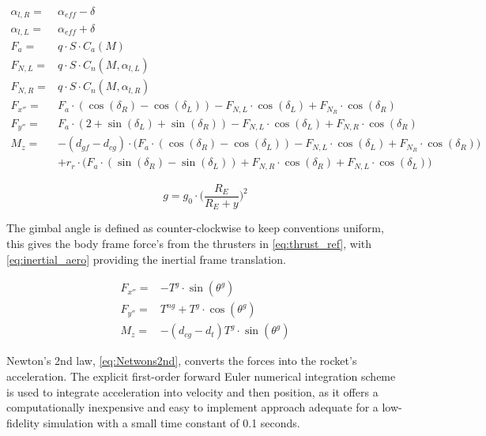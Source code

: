 \begin{equation}
\begin{aligned}
    \alpha_{l,R} =& \alpha_{eff} - \delta \\
    \alpha_{l,L} =& \alpha_{eff} + \delta \\
    F_a =& q \cdot S \cdot C_a(M) \\
    F_{N,L} =& q \cdot S \cdot C_n(M,\alpha_{l,L}) \\
    F_{N,R} =& q \cdot S \cdot C_n(M,\alpha_{l,R}) \\
    F_{x''} =& F_a \cdot (\cos(\delta_R) - \cos(\delta_L)) -F_{N,L} \cdot \cos(\delta_L) + F_{N_R} \cdot \cos(\delta_R) \\
    F_{y''} =& F_a \cdot (2 + \sin(\delta_L) + \sin(\delta_R)) - F_{N,L} \cdot \cos(\delta_L) + F_{N,R} \cdot \cos(\delta_R) \\
    M_z =& -(d_{gf}-d_{cg}) \cdot \bigg(F_a \cdot (\cos(\delta_R) - \cos(\delta_L)) -F_{N,L} \cdot \cos(\delta_L) + F_{N_R} \cdot \cos(\delta_R)\bigg) \\&+ r_r \cdot \bigg(F_{a} \cdot(\sin(\delta_R)-\sin(\delta_L) )+ F_{N,R} \cdot \cos(\delta_R) + F_{N,L} \cdot \cos(\delta_L)\bigg)
\end{aligned}
\label{eq:grid_fin_local_alpha}
\end{equation}


\begin{equation}
    g = g_0 \cdot \bigg(\frac{R_{E}}{R_{E} + y}\bigg)^2
\label{eq:grav}
\end{equation}


The gimbal angle is defined as counter-clockwise to keep conventions uniform, this gives the body frame force's from the thrusters in \autoref{eq:thrust_ref}, with \autoref{eq:inertial_aero} providing the inertial frame translation.

\begin{equation}
\begin{aligned}
    F_{x''} =& - T^g \cdot \sin(\theta^g) \\
    F_{y''} =& T^{ng} + T^g \cdot \cos(\theta^g) \\
    M_z =& -(d_{cg} - d_{t}) T^g \cdot \sin(\theta^g)
\end{aligned}
\label{eq:thrust_ref}
\end{equation}

Newton's 2nd law, \autoref{eq:Netwons2nd}, converts the forces into the rocket's acceleration. The explicit first-order forward Euler numerical integration scheme is used to integrate acceleration into velocity and then position, as it offers a computationally inexpensive and easy to implement approach adequate for a low-fidelity simulation with a small time constant of 0.1 seconds.

